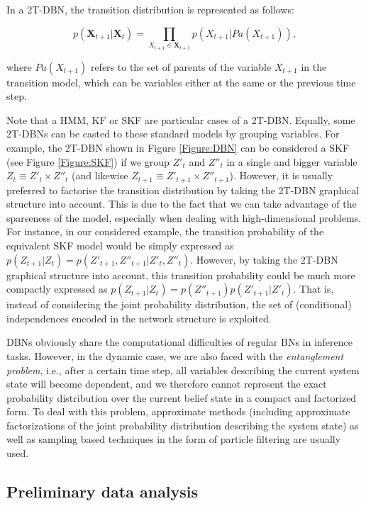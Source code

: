 In a 2T-DBN, the transition distribution is represented as follows:

$$ p(\bm X_{t+1} | \bm X_t) = \prod_{X_{t+1}\in\bm X_{t+1}} p(X_{t+1}|Pa(X_{t+1})),$$ 

\noindent where $Pa(X_{t+1})$ refers to the set of parents of the variable $X_{t+1}$ in the transition model, which can be variables either at the same or the previous time step. 

Note that a HMM, KF or SKF are particular cases of a 2T-DBN. Equally, some 2T-DBNs can be casted to these standard models by grouping variables. For example, the 2T-DBN shown in Figure \ref{Figure:DBN} can be considered a SKF (see Figure \ref{Figure:SKF}) if we group $Z'_t$ and $Z''_t$ in a single and bigger variable $Z_t \equiv Z'_t \times Z''_t $ (and likewise $Z_{t+1} \equiv Z'_{t+1} \times Z''_{t+1} $). However, it is usually preferred to factorise the transition distribution by taking the 2T-DBN graphical structure into account. This is due to the fact that we can take advantage of the sparseness of the model, especially when dealing with high-dimensional problems. For instance, in our considered example, the transition probability of the equivalent SKF model would be simply expressed as $p(Z_{t+1}|Z_t) = p(Z'_{t+1},Z''_{t+1}|Z'_t,Z''_t) $. However, by taking the 2T-DBN graphical structure into account, this transition probability could be much more compactly expressed as $p(Z_{t+1}|Z_t)=p(Z''_{t+1})p(Z'_{t+1}|Z'_t)$. That is, instead of considering the joint probability distribution, the set of (conditional) independences encoded in the network structure is exploited.

DBNs obviously share the computational difficulties of regular BNs in inference tasks. However, in the dynamic case, we are also faced with the \textit{entanglement problem}, i.e., after a certain time step, all variables describing the current system state will become dependent, and we therefore cannot represent the exact probability distribution over the current belief state in a compact and factorized form. To deal with this problem, approximate methods (including approximate factorizations of the joint probability distribution describing the system state) \cite{BoyenKoller1998} as well as sampling based techniques in the form of particle filtering \cite{Doucet2000} are usually used.

\subsection{Preliminary data analysis}\label{SubSection:DataAnalysis}

